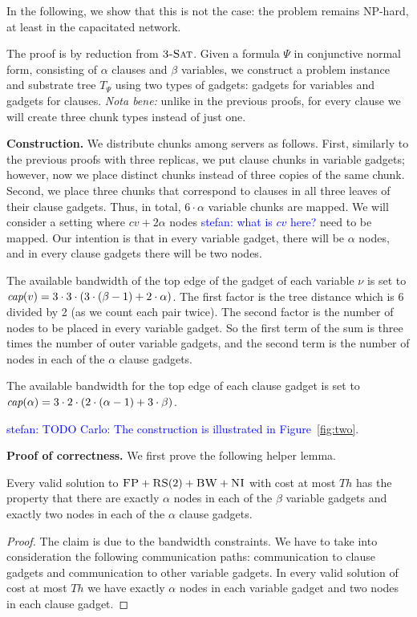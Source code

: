 \documentclass[9pt,twocolumn]{scrartcl}
\newcommand{\stefan}[1]{\textcolor{blue}{stefan: #1}}
\newcommand{\variab}{\nu}
\newcommand{\clauses}{\alpha}
\newcommand{\vars}{\beta}
\newcommand{\capa}{\emph{cap}}
\newcommand{\CC}{\textsc{NI}}
\newcommand{\FP}{\textsc{FP}}
\newcommand{\RS}{\textsc{RS}}
\newcommand{\BW}{\textsc{BW}}
\newcommand{\TSAT}{\textsc{3-Sat}}
\newcommand{\Formula}{\ensuremath{\Psi}}
\newcommand{\Thr}{\ensuremath{Th}}
\begin{document}
\begin{appendix}
In the following, we show that this is not the case: the problem remains
NP-hard, at least in the capacitated network.

The proof is by reduction from $\TSAT$. Given a formula $\Formula$ in
conjunctive normal form, consisting of $\clauses$ clauses and $\vars$ variables, we construct a problem instance and substrate tree
$T_{\Formula}$ using two types of gadgets: gadgets for variables and
gadgets for clauses. \emph{Nota bene:}
unlike in the previous proofs, for every clause we will create three chunk types instead of just one.

\textbf{Construction.}
We distribute chunks among servers as follows. First,
similarly to the previous proofs with three replicas, we put clause chunks in
variable gadgets; however, now we place distinct chunks instead of
three copies of the same chunk. Second, we place three chunks that
correspond to clauses in all three leaves of their clause gadgets.
Thus, in total, $6 \cdot \clauses$ variable chunks are mapped.
We will consider a setting where $cv + 2\clauses$ nodes \stefan{what is $cv$ here?} need to be mapped. Our intention is that in
every variable gadget, there will be $\clauses$ nodes,
 and in every clause
gadgets there will be two nodes.

The available bandwidth of the top edge of the gadget of each variable $\variab$ is set to
$\capa(v) = 3  \cdot  3  \cdot  (3  \cdot  (\vars - 1) + 2  \cdot  \clauses) $.
The first factor is the tree distance which is 6 divided by 2 (as
we count each pair twice). The second factor is
the number of nodes to be placed in every variable gadget.
So the first term of the
sum is three times the number of outer variable gadgets,
and the second term is the
number of nodes in each of the $\clauses$ clause gadgets.

The available bandwidth for the top edge of each clause gadget is set to
$\capa(\clauses) = 3  \cdot  2  \cdot  (2  \cdot  (\clauses - 1) + 3  \cdot  \vars) $.

\stefan{TODO Carlo: The construction is illustrated in Figure~\ref{fig:two}.}


\textbf{Proof of correctness.}
We first prove the following helper lemma.
\begin{lemma}
Every valid solution to $\FP+\RS(2)+\BW+\CC$
with cost at most $\Thr$ has the property that
there are exactly $\clauses$ nodes in each of the $\vars$ variable gadgets
and exactly two nodes in each of the $\clauses$ clause gadgets.
\end{lemma}
\begin{proof}
The claim is due to the bandwidth constraints. We have to take into
consideration the following communication paths:
communication to clause gadgets and
communication to
other variable gadgets.
In every valid solution of cost at most $\Thr$ we have exactly
$\clauses$ nodes in each variable gadget and two nodes in each clause gadget.
\end{proof}


\end{appendix}
\end{document}
